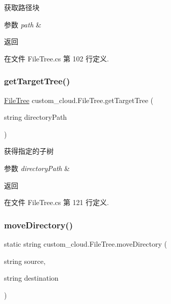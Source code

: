 获取路径块 


\begin{DoxyParams}{参数}
{\em path} & \\
\hline
\end{DoxyParams}
\begin{DoxyReturn}{返回}

\end{DoxyReturn}


在文件 File\+Tree.\+cs 第 102 行定义.

\mbox{\label{classcustom__cloud_1_1_file_tree_adededfbaf277559b9bd7c01a9da81caf}} 
\subsubsection{\texorpdfstring{get\+Target\+Tree()}{getTargetTree()}}
{\footnotesize\ttfamily \hyperlink{classcustom__cloud_1_1_file_tree}{File\+Tree} custom\+\_\+cloud.\+File\+Tree.\+get\+Target\+Tree (\begin{DoxyParamCaption}\item[{string}]{directory\+Path }\end{DoxyParamCaption})}



获得指定的子树 


\begin{DoxyParams}{参数}
{\em directory\+Path} & \\
\hline
\end{DoxyParams}
\begin{DoxyReturn}{返回}

\end{DoxyReturn}


在文件 File\+Tree.\+cs 第 121 行定义.

\mbox{\label{classcustom__cloud_1_1_file_tree_a42f07545063f1300dafcc59005edd9e1}} 
\subsubsection{\texorpdfstring{move\+Directory()}{moveDirectory()}}
{\footnotesize\ttfamily static string custom\+\_\+cloud.\+File\+Tree.\+move\+Directory (\begin{DoxyParamCaption}\item[{string}]{source,  }\item[{string}]{destination }\end{DoxyParamCaption})\hspace{0.3cm}{\ttfamily [static]}}



